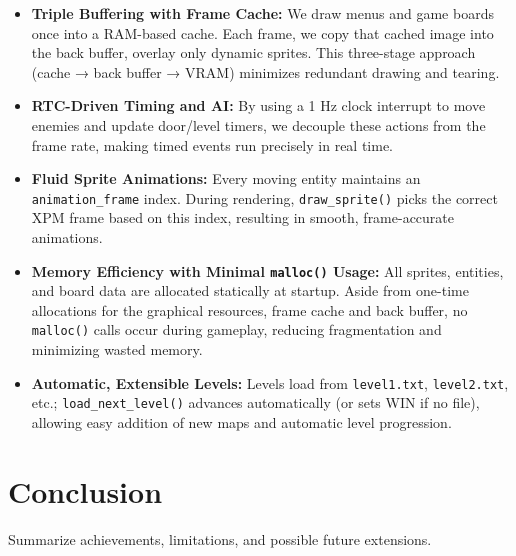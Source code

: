 \documentclass[12pt,a4paper]{article}
\begin{document}
\begin{itemize}
  \item \textbf{Triple Buffering with Frame Cache:}
    We draw menus and game boards once into a RAM-based cache. Each frame, we copy that cached image into the back buffer, overlay only dynamic sprites. This three-stage approach (cache → back buffer → VRAM) minimizes redundant drawing and tearing.

  \item \textbf{RTC-Driven Timing and AI:}
    By using a 1 Hz clock interrupt to move enemies and update door/level timers, we decouple these actions from the frame rate, making timed events run precisely in real time.

  \item \textbf{Fluid Sprite Animations:}
    Every moving entity maintains an \texttt{animation\_frame} index. During rendering, \texttt{draw\_sprite()} picks the correct XPM frame based on this index, resulting in smooth, frame-accurate animations.

  \item \textbf{Memory Efficiency with Minimal \texttt{malloc()} Usage:}
    All sprites, entities, and board data are allocated statically at startup. Aside from one-time allocations for the graphical resources, frame cache and back buffer, no \texttt{malloc()} calls occur during gameplay, reducing fragmentation and minimizing wasted memory.

  \item \textbf{Automatic, Extensible Levels:}
    Levels load from \texttt{level1.txt}, \texttt{level2.txt}, etc.; \texttt{load\_next\_level()} advances automatically (or sets WIN if no file), allowing easy addition of new maps and automatic level progression.
\end{itemize}


\section{Conclusion}
Summarize achievements, limitations, and possible future extensions. %
\end{document}
